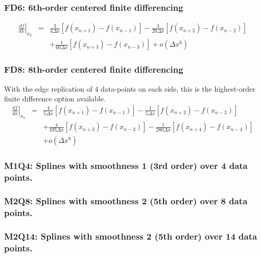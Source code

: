 \documentclass[11pt]{article}
\def\bea{\begin{eqnarray}}
\def\eea{\end{eqnarray}}
\begin{document}
\subsubsection*{FD6: 6th-order centered finite differencing}

\bea \left.\frac{df}{dx}\right|_{x_n} &=&
\frac{3}{4\Delta
x}[f(x_{n+1})-f(x_{n-1})]-\frac{3}{20\Delta x}[f(x_{n+2})-f(x_{n-2})]\nonumber\\
&&+\frac{1}{60\Delta x}[f(x_{n+3})-f(x_{n-3})]+o(\Delta x^6) \eea

\subsubsection*{FD8: 8th-order centered finite differencing}
With the edge replication of 4 data-points on each side, this is the highest-order finite difference option available.
\bea \left.\frac{df}{dx}\right|_{x_n} &=&
\frac{4}{5\Delta
x}[f(x_{n+1})-f(x_{n-1})]-\frac{1}{5\Delta x}[f(x_{n+2})-f(x_{n-2})]\nonumber\\
&&+\frac{4}{105\Delta x}[f(x_{n+3})-f(x_{n-3})]-\frac{1}{280\Delta
x}[f(x_{n+4})-f(x_{n-4})]\nonumber\\
&& +o(\Delta x^8) \eea

\subsubsection*{M1Q4: Splines with smoothness 1 (3rd order) over 4 data points.}
\subsubsection*{M2Q8: Splines with smoothness 2 (5th order) over 8 data points.}
\subsubsection*{M2Q14: Splines with smoothness 2 (5th order) over 14 data points.}
\end{document}
